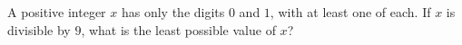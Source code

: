 A positive integer $x$ has only the digits $0$ and $1$, with at least one of each. If $x$ is divisible by $9$, what is the least possible value of $x$?
